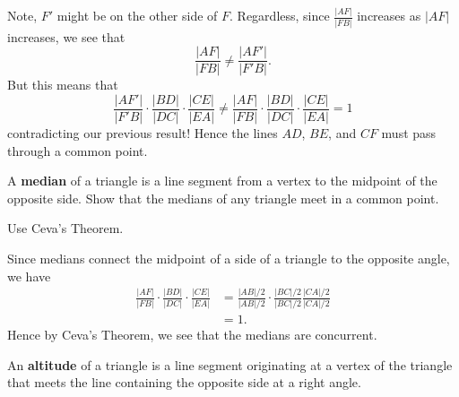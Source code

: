\documentclass[newpage,hints,handout,nooutcomes,noauthor,12pt]{ximera}
\begin{document}
\begin{problem}
\begin{freeResponse}
\begin{image}
\end{image}
Note, $F'$ might be on the other side of $F$. Regardless, since
$\frac{|AF|}{|FB|}$ increases as $|AF|$ increases, we see that
\[
\frac{|AF|}{|FB|} \ne \frac{|AF'|}{|F'B|}.
\]
But this means that 
\[
\frac{|AF'|}{|F'B|}\cdot\frac{|BD|}{|DC|}\cdot\frac{|CE|}{|EA|}\ne\frac{|AF|}{|FB|}\cdot\frac{|BD|}{|DC|}\cdot\frac{|CE|}{|EA|}=1
\]
contradicting our previous result! Hence the lines $AD$, $BE$, and $CF$ must
pass through a common point.
\end{freeResponse}
\end{problem}

\begin{problem}
A \textbf{median} of a triangle is a line segment from a vertex
to the midpoint of the opposite side. Show that the medians of any triangle
meet in a common point.

\begin{hint}
Use Ceva's Theorem.
\end{hint}
\begin{freeResponse}
Since medians connect the midpoint of a side of a triangle to the
opposite angle, we have
\begin{align*}
\frac{|AF|}{|FB|}\cdot\frac{|BD|}{|DC|}\cdot\frac{|CE|}{|EA|} &= 
\frac{|AB|/2}{|AB|/2}\cdot\frac{|BC|/2}{|BC|/2}\frac{|CA|/2}{|CA|/2}\\
&= 1.
\end{align*}
Hence by Ceva's Theorem, we see that the medians are concurrent. 
\end{freeResponse}
\end{problem}

\begin{definition} 
An \textbf{altitude} of a triangle is a line segment originating at a
vertex of the triangle that meets the line containing the opposite
side at a right angle.
\end{definition}
\end{document}
